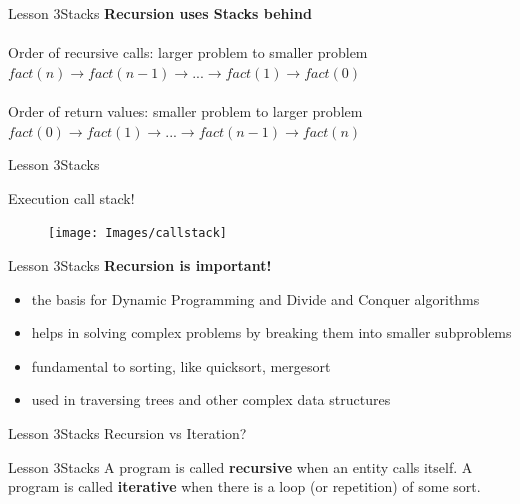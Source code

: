 \documentclass[aspectratio=1610]{beamer}
\begin{document}
\begin{frame}{Lesson 3}{Stacks}
\LARGE
\textbf{Recursion uses Stacks behind}\\~\\
Order of recursive calls: larger problem to smaller problem
$fact(n) \rightarrow fact(n -1) \rightarrow ... 	\rightarrow fact(1) 	\rightarrow fact(0)$\\~\\
Order of return values: smaller problem to larger problem
$fact(0) \rightarrow fact(1) \rightarrow ... \rightarrow fact(n - 1) \rightarrow fact(n)$
\end{frame}


\begin{frame}{Lesson 3}{Stacks}
\LARGE
\begin{minipage}{0.50\textwidth}
    Execution call stack!
  \end{minipage}
\begin{minipage}{.0\textwidth}
      \begin{figure}
        \texttt{[image: Images/callstack]}
      \end{figure}
  \end{minipage}  
\end{frame}



\begin{frame}{Lesson 3}{Stacks}
\LARGE
\textbf{Recursion is important!}\\
\begin{itemize}
    \item the basis for Dynamic Programming and Divide and Conquer algorithms
    \item helps in solving complex problems by breaking them into smaller subproblems
    \item fundamental to sorting, like quicksort, mergesort
    \item used in traversing trees and other complex data structures
\end{itemize}
\end{frame}



\begin{frame}{Lesson 3}{Stacks}
\Huge
Recursion vs Iteration?
\end{frame}


\begin{frame}{Lesson 3}{Stacks}
\huge
A program is called \textbf{recursive} when an entity calls itself.
A program is called \textbf{iterative} when there is a loop (or
repetition) of some sort.
\end{frame}
\end{document}
